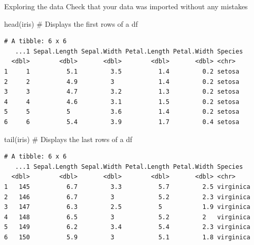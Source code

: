 \documentclass[
  ignorenonframetext,
  aspectratio=169,
]{beamer}
\newenvironment{Shaded}{\begin{snugshade}}{\end{snugshade}}
\newcommand{\CommentTok}[1]{\textcolor[rgb]{0.37,0.37,0.37}{#1}}
\newcommand{\FunctionTok}[1]{\textcolor[rgb]{0.28,0.35,0.67}{#1}}
\newcommand{\NormalTok}[1]{\textcolor[rgb]{0.00,0.23,0.31}{#1}}
\begin{document}
\begin{frame}[fragile]{Exploring the data}
\label{exploring-the-data}
Check that your data was imported without any mistakes

\begin{Shaded}
\begin{Highlighting}[]
\FunctionTok{head}\NormalTok{(iris)    }\CommentTok{\# Displays the first rows of a df}
\end{Highlighting}
\end{Shaded}

\begin{verbatim}
# A tibble: 6 x 6
   ...1 Sepal.Length Sepal.Width Petal.Length Petal.Width Species
  <dbl>        <dbl>       <dbl>        <dbl>       <dbl> <chr>  
1     1          5.1         3.5          1.4         0.2 setosa 
2     2          4.9         3            1.4         0.2 setosa 
3     3          4.7         3.2          1.3         0.2 setosa 
4     4          4.6         3.1          1.5         0.2 setosa 
5     5          5           3.6          1.4         0.2 setosa 
6     6          5.4         3.9          1.7         0.4 setosa 
\end{verbatim}

\begin{Shaded}
\begin{Highlighting}[]
\FunctionTok{tail}\NormalTok{(iris)  }\CommentTok{\# Displays the last rows of a df}
\end{Highlighting}
\end{Shaded}

\begin{verbatim}
# A tibble: 6 x 6
   ...1 Sepal.Length Sepal.Width Petal.Length Petal.Width Species  
  <dbl>        <dbl>       <dbl>        <dbl>       <dbl> <chr>    
1   145          6.7         3.3          5.7         2.5 virginica
2   146          6.7         3            5.2         2.3 virginica
3   147          6.3         2.5          5           1.9 virginica
4   148          6.5         3            5.2         2   virginica
5   149          6.2         3.4          5.4         2.3 virginica
6   150          5.9         3            5.1         1.8 virginica
\end{verbatim}
\end{frame}
\end{document}
